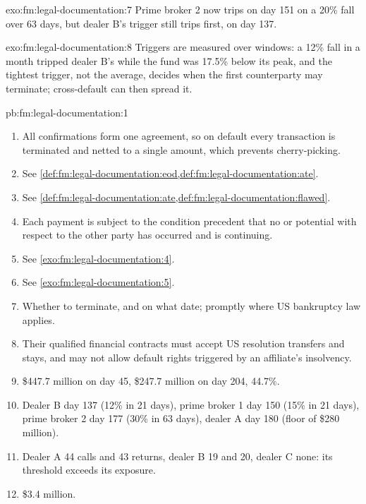 \begin{solution}{exo:fm:legal-documentation:7}
Prime broker 2 now trips on day 151 on a 20\% fall over 63 days, but dealer B's trigger still trips first, on day 137.
\end{solution}

\begin{solution}{exo:fm:legal-documentation:8}
Triggers are measured over windows: a 12\% fall in a month tripped dealer B's while the fund was 17.5\% below its peak, and the tightest trigger,
not the average, decides when the first counterparty may terminate; cross-default can then spread it.
\end{solution}

\begin{solution}{pb:fm:legal-documentation:1}
\begin{enumerate}
\item All confirmations form one agreement, so on default every transaction is terminated and netted to a single amount, which prevents
cherry-picking.
\item See \cref{def:fm:legal-documentation:eod,def:fm:legal-documentation:ate}.
\item See \cref{def:fm:legal-documentation:ate,def:fm:legal-documentation:flawed}.
\item Each payment is subject to the condition precedent that no  or potential  with respect to the other party
has occurred and is continuing.
\item See \cref{exo:fm:legal-documentation:4}.
\item See \cref{exo:fm:legal-documentation:5}.
\item Whether to terminate, and on what date; promptly where US bankruptcy law applies.
\item Their qualified financial contracts must accept US resolution transfers and stays, and may not allow default rights triggered by an
affiliate's insolvency.
\item \$447.7 million on day 45, \$247.7 million on day 204, 44.7\%.
\item Dealer B day 137 (12\% in 21 days), prime broker 1 day 150 (15\% in 21 days), prime broker 2 day 177 (30\% in 63 days), dealer A day 180
(floor of \$280 million).
\item Dealer A 44 calls and 43 returns, dealer B 19 and 20, dealer C none: its threshold exceeds its exposure.
\item \$3.4 million.

\end{enumerate}
\end{solution}
